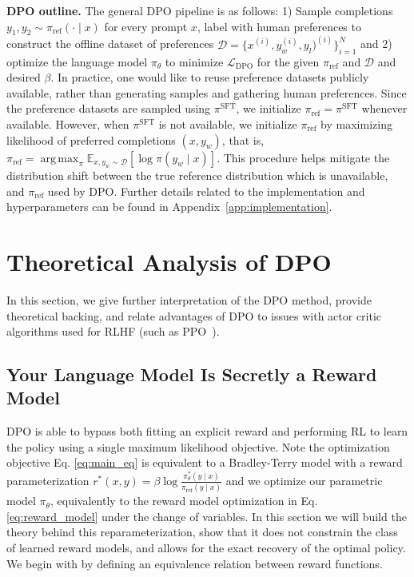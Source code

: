 \documentclass{article}
\newcommand{\rev}[2]{{#2}}
\DeclareMathOperator*{\argmax}{arg\,max}
\newcommand{\piref}{\pi_\text{ref}}
\newcommand{\pisft}{\pi^\text{SFT}}
\begin{document}
\textbf{DPO outline.} 
The general DPO pipeline is as follows: 1) Sample completions $y_1, y_2 \sim \piref(\cdot \mid x)$ for every prompt $x$, label with human preferences to construct the offline dataset of preferences $\mathcal{D} = \{x^{(i)}, y_w^{(i)}, y_l)^{(i)}\}_{i=1}^N$ and 2) optimize the language model $\pi_\theta$ to minimize $\mathcal{L}_\text{DPO}$ for the given $\piref$ and $\mathcal{D}$ and desired $\beta$. 
In practice, one would like to reuse preference datasets publicly available, rather than generating samples and gathering human preferences. Since the preference datasets are sampled using $\pisft$, we initialize $\piref = \pisft$ whenever available. However, when $\pisft$ is not available, we initialize $\piref$ by maximizing likelihood of preferred completions ${(x, y_w)}$, that is, ${\piref = \argmax_{\pi}\mathbb{E}_{x, y_w \sim \mathcal{D}}\left[\log \pi(y_w \mid x)\right]}$. This procedure helps mitigate the distribution shift between the true reference distribution which is unavailable, and $\piref$ used by DPO. Further details related to the implementation and hyperparameters can be found in Appendix~\ref{app:implementation}.

\section{Theoretical Analysis of DPO}
In this section, we give further interpretation of the DPO method, provide theoretical backing, and relate advantages of DPO to issues with actor critic algorithms used for RLHF (such as PPO~\cite{schulman2017proximal}).

\label{sec:theory}

\subsection{Your Language Model Is Secretly a Reward Model} DPO is able to bypass both \rev{explicit reward estimation}{fitting an explicit reward} and performing RL to learn the policy using a single maximum likelihood objective. Note the optimization objective Eq. \ref{eq:main_eq} is equivalent to a Bradley-Terry model with a reward parameterization $r^*(x, y) = \beta \log\frac{\pi^*_\theta(y \mid x)}{\piref(y \mid x)}$ and we optimize our parametric model $\pi_{\theta}$, equivalently to the reward model optimization in Eq. \ref{eq:reward_model} under the change of variables. In this section we will build the theory behind this reparameterization, show that it does not constrain the class of learned reward models, and allows for the exact recovery of the optimal policy. We begin with by defining an equivalence relation between reward functions. 
\end{document}

